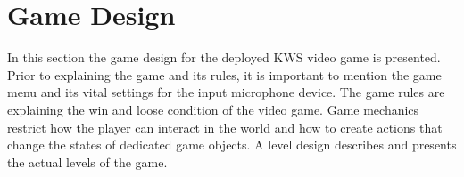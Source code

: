 
\section{Game Design}\label{sec:game_design}
\thesisStateReady
In this section the game design for the deployed KWS video game is presented.
Prior to explaining the game and its rules, it is important to mention the game menu and its vital settings for the input microphone device.
The game rules are explaining the win and loose condition of the video game.
Game mechanics restrict how the player can interact in the world and how to create actions that change the states of dedicated game objects.
A level design describes and presents the actual levels of the game.



